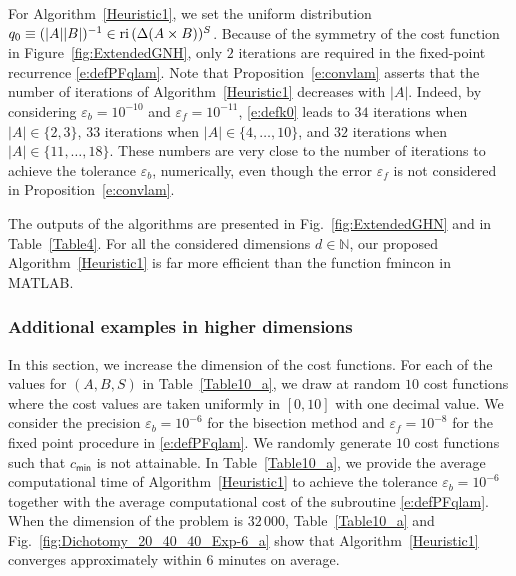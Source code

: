 \documentclass[smallextended,referee,envcountsect,]{svjour3}
\newcommand{\reli}{\ensuremath{\text{\rm ri}\,}}
\newcommand{\NN}{{\mathbb N}}
\begin{document}
For Algorithm~\ref{Heuristic1}, we set the uniform distribution 
$q_0\equiv (|A||B|)^{-1}\in\reli(\Delta(A\times B))^S$. Because of 
the symmetry of the 
cost 
function in Figure~\ref{fig:ExtendedGNH}, only $2$ iterations are 
required in the fixed-point recurrence \eqref{e:defPFqlam}. 
Note that Proposition~\ref{e:convlam} asserts that the number of 
iterations of 
Algorithm~\ref{Heuristic1} 
decreases with $|A|$. Indeed, by considering 
$\varepsilon_b=10^{-10}$
and $\varepsilon_f=10^{-11}$, \eqref{e:defk0} leads to
$34$ 
iterations when $|A|\in\{2,3\}$, $33$ iterations when 
$|A|\in\{4,\ldots,10\}$, and $32$ iterations when 
$|A|\in\{11,\ldots,18\}$. These numbers are very close to the 
number of iterations to achieve the tolerance $\varepsilon_b$, 
numerically, even though the error $\varepsilon_f$ is not 
considered in Proposition~\ref{e:convlam}. 

The outputs of the algorithms are presented in 
Fig.~\ref{fig:ExtendedGHN} and in Table~\ref{Table4}. For all the 
considered dimensions $d\in\NN$, our proposed 
Algorithm~\ref{Heuristic1} is far more efficient than {the function 
fmincon} in MATLAB.




\subsubsection{Additional examples in higher
dimensions}\label{sec:dimension10}%



In this section, we increase the dimension of the cost functions. 
For each of the values for $(A,B,S)$ in Table~\ref{Table10_a}, we 
draw at random $10$ cost functions where the cost values are 
taken uniformly in $[0,10]$ with one decimal 
value. We consider the precision $\varepsilon_b=10^{-6}$ for the 
bisection method and $\varepsilon_f=10^{-8}$ for the fixed point 
procedure in \eqref{e:defPFqlam}. 
We randomly generate $10$ cost functions such that 
$c_{\mathsf{min}}$ is not 
attainable. In Table~\ref{Table10_a}, we provide the average 
computational time of Algorithm~\ref{Heuristic1} to achieve the 
tolerance $\varepsilon_b=10^{-6}$ together with the average 
computational cost of the subroutine \eqref{e:defPFqlam}.
When the dimension of the 
problem is  $32 \,000$, 
Table~\ref{Table10_a} and 
Fig.~\ref{fig:Dichotomy_20_40_40_Exp-6_a} show that 
Algorithm~\ref{Heuristic1} converges approximately within $6$ 
minutes on average.
\end{document}
